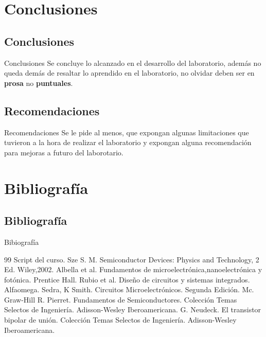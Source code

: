 \documentclass[mathserif,spanish]{beamer}
\begin{document}
\section{Conclusiones}              %
    \subsection{Conclusiones}       %
        \begin{frame}{Conclusiones}
            Se concluye lo alcanzado en el desarrollo del laboratorio, además no queda demás de resaltar lo aprendido en el laboratorio, no olvidar deben ser en \textbf{prosa} no \textbf{puntuales}.
        \end{frame}

    \subsection{Recomendaciones}    %
        \begin{frame}{Recomendaciones}
            Se le pide al menos, que expongan algunas limitaciones que tuvieron a la hora de realizar el laboratorio y expongan alguna recomendación para mejoras a futuro del laborotario.
        \end{frame}

\section{Bibliografía}              %
    \subsection{Bibliografía}       %
        \begin{frame}{Bibiografía}
            \footnotesize{
                \begin{thebibliography}{99} 
                \justifying
                Script del curso.
                Sze S. M. Semiconductor Devices: Physics and Technology, 2 Ed. Wiley,2002.
                Albella et al. Fundamentos de microelectr\'onica,nanoelectr\'onica y fot\'onica. Prentice Hall.
                Rubio et al. Dise\~no de circuitos y sistemas integrados. Alfaomega.
                Sedra, K Smith. Circuitos Microelectr\'onicos. Segunda Edici\'on. Mc. Graw-Hill
                R. Pierret. Fundamentos de Semiconductores. Colecci\'on Temas Selectos de Ingenier\'ia. Adisson-Wesley Iberoamericana.
                G. Neudeck. El transistor bipolar de uni\'on. Colecci\'on Temas Selectos de Ingenier\'ia. Adisson-Wesley Iberoamericana.
                \end{thebibliography}
                }
        \end{frame}          
\end{document}
